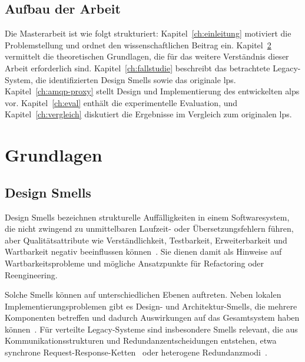 \section{Aufbau der Arbeit}

Die Masterarbeit ist wie folgt strukturiert: Kapitel~\ref{ch:einleitung} motiviert die Problemstellung und ordnet den wissenschaftlichen Beitrag ein. Kapitel~\ref{ch:grundlagen} vermittelt die theoretischen Grundlagen, die für das weitere Verständnis dieser Arbeit erforderlich sind. Kapitel~\ref{ch:fallstudie} beschreibt das betrachtete Legacy-System, die identifizierten Design Smells sowie das originale \gls{lps}. Kapitel~\ref{ch:amqp-proxy} stellt Design und Implementierung des entwickelten \gls{alps} vor. Kapitel~\ref{ch:eval} enthält die experimentelle Evaluation, und Kapitel~\ref{ch:vergleich} diskutiert die Ergebnisse im Vergleich zum originalen \gls{lps}.

\chapter{Grundlagen}
\label{ch:grundlagen}

\section{Design Smells}


Design Smells bezeichnen strukturelle Auffälligkeiten in einem Softwaresystem, die nicht zwingend zu unmittelbaren Laufzeit- oder Übersetzungsfehlern führen, aber Qualitätsattribute wie Verständlichkeit, Testbarkeit, Erweiterbarkeit und Wartbarkeit negativ beeinflussen können~\citep{software_design_smell_detection}. Sie dienen damit als Hinweise auf Wartbarkeitsprobleme und mögliche Ansatzpunkte für Refactoring oder Reengineering.

Solche Smells können auf unterschiedlichen Ebenen auftreten. Neben lokalen Implementierungsproblemen gibt es Design- und Architektur-Smells, die mehrere Komponenten betreffen und dadurch Auswirkungen auf das Gesamtsystem haben können~\citep{refactoring_for_software_architecture_smells}. Für verteilte Legacy-Systeme sind insbesondere Smells relevant, die aus Kommunikationsstrukturen und Redundanzentscheidungen entstehen, etwa synchrone Request-Response-Ketten~\citep{tiwari_unveiling_2024, liebig_2025_architectural_refactoring} oder heterogene Redundanzmodi~\citep{choudhary_rajesh_high_2025, liebig_2025_architectural_refactoring}.

